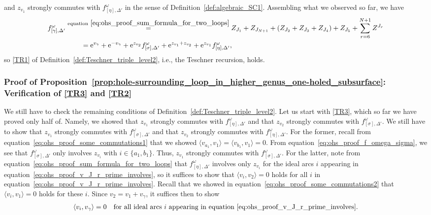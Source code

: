 \documentclass[pdftex]{sigma}
\numberwithin{equation}{section}
\theoremstyle{definition}
\begin{document}
and $z_{v_1}$ strongly commutes with $f^\omega_{[\eta],\Delta'}$ in the sense of Definition~\ref{def:algebraic_SC1}.
Assembling what we observed so far, we have
\begin{align*}
f^\omega_{[\gamma],\Delta'}
 & \stackrel{{\rm equation}~\eqref{eq:ohs_proof_sum_formula_for_two_loops}}{=} Z_{J_1} + Z_{J_{N+1}} + (Z_{J_2}+Z_{J_3}+Z_{J_4}) + Z_{J_5} + \sum_{r=6}^{N+1} Z^{J_r} \\
 & \hspace{7.9mm} = {\rm e}^{v_\gamma} + {\rm e}^{-v_\gamma} + {\rm e}^{z_{v_2}} f^\omega_{[\sigma],\Delta'} + {\rm e}^{z_{v_1} + z_{v_2}} + {\rm e}^{z_{v_1}} f^\omega_{[\eta],\Delta'},
\end{align*}
so \ref{TR1} of Definition~\ref{def:Teschner_triple_level2}, i.e., the Teschner recursion, holds.
\subsubsection{Proof of Proposition~\ref{prop:hole-surrounding_loop_in_higher_genus_one-holed_subsurface}: Verification of \ref{TR3} and \ref{TR2}}
We still have to check the remaining conditions of Definition~\ref{def:Teschner_triple_level2}. Let us start with \ref{TR3}, which so far we have proved only half of. Namely, we showed that $z_{v_1}$ strongly commutes with $f^\omega_{[\eta],\Delta'}$ and that $z_{v_2}$ strongly commutes with $f^\omega_{[\sigma],\Delta'}$. We still have to show that $z_{v_1}$ strongly commutes with $f^\omega_{[\sigma],\Delta'}$ and that $z_{v_2}$ strongly commutes with $f^\omega_{[\eta],\Delta'}$. For the former, recall from equation~\eqref{eq:ohs_proof_some_commutations1} that we showed $\langle v_{a_1},v_1 \rangle =\langle v_{b_1},v_1\rangle=0$. From equation~\eqref{eq:ohs_proof_f_omega_sigma}, we see that $f^\omega_{[\sigma],\Delta'}$ only involves $z_{v_i}$ with $i \in \{a_1,b_1\}$. Thus, $z_{v_1}$ strongly commutes with $f^\omega_{[\sigma],\Delta'}$. For the latter, note from equation~\eqref{eq:ohs_proof_sum_formula_for_two_loops} that $f^\omega_{[\eta],\Delta'}$ involves only $z_{v_i}$ for the ideal arcs $i$ appearing in equation~\eqref{eq:ohs_proof_v_J_r_prime_involves}, so it suffices to show that $\langle v_i, v_2\rangle=0$ holds for all $i$ in equation~\eqref{eq:ohs_proof_v_J_r_prime_involves}. Recall that we showed in equation~\eqref{eq:ohs_proof_some_commutations2} that $\langle v_i, v_1\rangle=0$ holds for these $i$. Since $v_2 = v_1 +v_\gamma$, it suffices then to show
\begin{align}
\label{eq:ohs_proof_some_commutations3}
\langle v_i, v_\gamma\rangle = 0 \quad \text{for all ideal arcs $i$ appearing in equation~\eqref{eq:ohs_proof_v_J_r_prime_involves}.}
\end{align}
\end{document}
